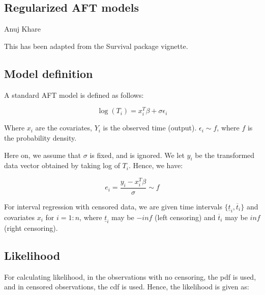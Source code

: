 \documentclass[12pt,a4paper]{report}
\begin{document}
\begin{center} \section*{Regularized AFT models} Anuj Khare \end{center}
This has been adapted from the Survival package vignette.
\subsection*{Model definition}
A standard AFT model is defined as follows:


\begin{equation}
	\log (T_i) = x_i^T \beta + \sigma \epsilon_i
\end{equation}

Where $x_i$ are the covariates, $Y_i$ is the observed time (output). $\epsilon_i \sim f$, where $f$ is the probability density.

%
%

Here on, we assume that $\sigma$ is fixed, and is ignored.
We let $y_i$ be the transformed data vector obtained by taking log of $T_i$. Hence, we have:

\begin{equation}
	e_i = \frac{y_i - x_i^T \beta} {\sigma} \sim f
\end{equation}


For interval regression with censored data, we are given time intervals $\{\underline t_i, \overline t_i\}$ and covariates $x_i$ for $i=1:n$, where $\underline t_i$ may be $-inf$
(left censoring) and $\overline t_i$ may be $inf$ (right censoring).

\subsection*{Likelihood}
For calculating likelihood, in the observations with no censoring, the pdf is used, and in censored observations, the cdf is used. Hence, the likelihood is given as:
\end{document}
